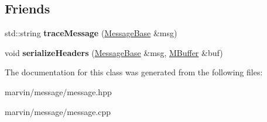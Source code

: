 \subsection*{Friends}
\begin{DoxyCompactItemize}
\item 
\mbox{\label{class_message_base_acb21b1e7f1d029519af4fec437c4791b}} 
std\+::string {\bfseries trace\+Message} (\hyperlink{class_message_base}{Message\+Base} \&msg)
\item 
\mbox{\label{class_message_base_a2eab8867f8d6105bb286295df101bcb4}} 
void {\bfseries serialize\+Headers} (\hyperlink{class_message_base}{Message\+Base} \&msg, \hyperlink{struct_m_buffer}{M\+Buffer} \&buf)
\end{DoxyCompactItemize}


The documentation for this class was generated from the following files\+:\begin{DoxyCompactItemize}
\item 
marvin/message/message.\+hpp\item 
marvin/message/message.\+cpp\end{DoxyCompactItemize}
